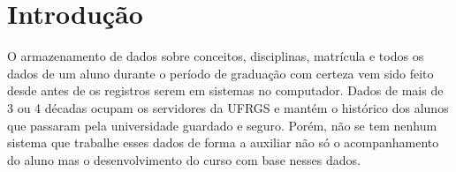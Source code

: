\documentclass[cic,tc]{iiufrgs}
\begin{document}
\tableofcontents

%     
%
%
%
%     

%     
%
%
%
\chapter{Introdução}\label{cap_1_intro}
O armazenamento de dados sobre conceitos, disciplinas, matrícula e todos os dados de um aluno durante o período de graduação com certeza vem sido feito desde antes de os registros serem em sistemas no computador. Dados de mais de 3 ou 4 décadas ocupam os servidores da UFRGS e mantém o histórico dos alunos que passaram pela universidade guardado e seguro. Porém, não se tem nenhum sistema que trabalhe esses dados de forma a auxiliar não só o acompanhamento do aluno mas o desenvolvimento do curso com base nesses dados. 
\end{document}
